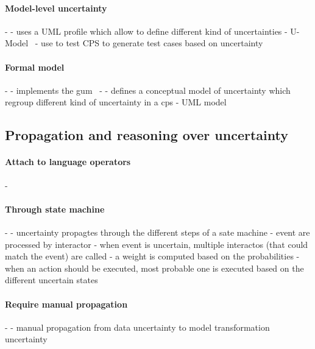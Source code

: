 \paragraph{Model-level uncertainty}
- \cite{DBLP:journals/sosym/Zhang00NO19}
	- uses a UML profile which allow to define different kind of uncertainties
	- U-Model~\cite{DBLP:conf/ecmdafa/ZhangSAYON16}
	- use to test CPS to generate test cases based on uncertainty
	
\paragraph{Formal model}
- \cite{DBLP:journals/csi/Hall06}
	- implements the \gls{gum}~\cite{metrology2008evaluation}
- \cite{DBLP:conf/ecmdafa/ZhangSAYON16}
	- defines a conceptual model of uncertainty which regroup different kind of uncertainty in a \gls{cps}
	- UML model
\subsection{Propagation and reasoning over uncertainty}

\paragraph{Attach to language operators}
- \cite{DBLP:conf/models/BurguenoBMV18, baudin2017openturns, DBLP:journals/corr/BorgstromGGMG13, DBLP:conf/ecmdafa/BertoaMBBTV18, osti_1430202, DBLP:conf/sle/MayerhoferWV16, DBLP:journals/peerj-cs/SalvatierWF16, DBLP:conf/quatic/VallecilloMO16, DBLP:conf/popl/BhatAVG12, DBLP:conf/aistats/ChagantyNR13, DBLP:journals/siamsc/JaroszewiczK12, DBLP:journals/toplas/ParkPT08, DBLP:conf/ijcai/Pfeffer01, DBLP:conf/popl/RamseyP02, DBLP:conf/pldi/SankaranarayananCG13, DBLP:conf/icra/Thrun00, DBLP:journals/sac/LunnTBS00, plummer2003jags}

\paragraph{Through state machine}
- \cite{DBLP:conf/uist/SchwarzMH11}
	- uncertainty propagtes through the different steps of a sate machine
	- event are processed by interactor
	- when event is uncertain, multiple interactos (that could match the event) are called
	- a weight is computed based on the probabilities
	- when an action should be executed, most probable one is executed based on the different uncertain states

\paragraph{Require manual propagation}
- \cite{DBLP:conf/models/BurguenoBMV18}
	- manual propagation from data uncertainty to model transformation uncertainty 
	
